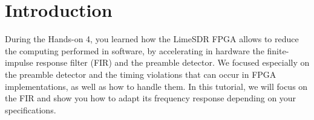 \section*{Introduction}

During the Hands-on 4, you learned how the LimeSDR FPGA allows to reduce the computing performed in software, by accelerating in hardware the finite-impulse response filter (FIR) and the preamble detector. We focused especially on the preamble detector and the timing violations that can occur in FPGA implementations, as well as how to handle them. In this tutorial, we will focus on the FIR and show you how to adapt its frequency response depending on your specifications. \\
